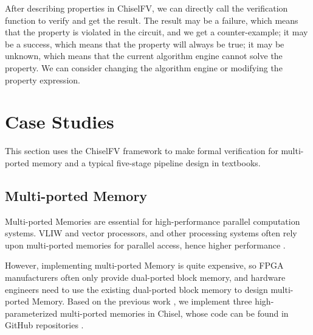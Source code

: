 \documentclass[conference]{IEEEtran}
\theoremstyle{definition}
\begin{document}
After describing properties in ChiselFV, we can directly call the verification function to verify and get the result.
The result may be a failure, which means that the property is violated in the circuit, and we get a counter-example; 
it may be a success, which means that the property will always be true; 
it may be unknown, which means that the current algorithm engine cannot solve the property. We can consider changing the algorithm engine or modifying the property expression.

\section{Case Studies}

This section uses the ChiselFV framework to make formal verification for multi-ported memory and a typical five-stage pipeline design in textbooks.

\subsection{Multi-ported Memory}

Multi-ported Memories are essential for high-performance parallel computation systems. VLIW and vector processors, and other processing systems often rely upon multi-ported memories for parallel access, hence higher performance \cite{abdelhadi2014modular}. 

However, implementing multi-ported Memory is quite expensive, so FPGA manufacturers often only provide dual-ported block memory, and hardware engineers need to use the existing dual-ported block memory to design multi-ported Memory. 
Based on the previous work \cite{xiang2022parameterized}, we implement three high-parameterized multi-ported memories in Chisel, whose code can be found in GitHub repositories \cite{mpMemory}.
\end{document}
